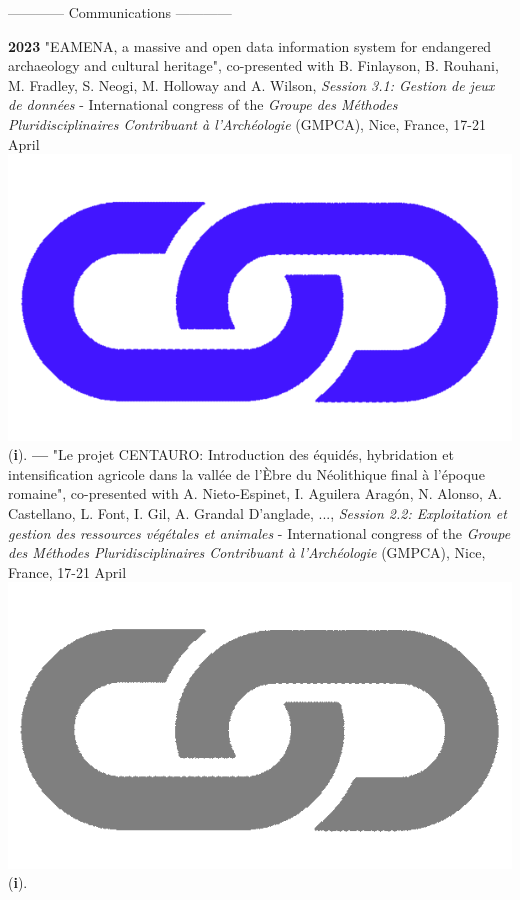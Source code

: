 \documentclass{article}
\begin{document}
\begin{center}------------ Communications ------------\end{center}
\smallbreak
\textbf{2023 }"EAMENA, a massive and open data information system for endangered archaeology and cultural heritage", co-presented with B. Finlayson, B. Rouhani, M. Fradley, S. Neogi, M. Holloway and A. Wilson, \textit{Session 3.1: Gestion de jeux de données} - International congress of the \textit{Groupe des Méthodes Pluridisciplinaires Contribuant à l'Archéologie} (GMPCA), Nice, France, 17-21 April \href{https://eamena-project.github.io/eamena-arches-dev/talks/2023-gmpca/pres/#/title-slide}{\includegraphics[scale=0.02]{link_darkblue.png}} (\textbf{i}).
\smallbreak
\textbf{--- }"Le projet CENTAURO: Introduction des équidés, hybridation et intensification agricole dans la vallée de l'Èbre du Néolithique final à l'époque romaine", co-presented with A. Nieto-Espinet, I. Aguilera Aragón, N. Alonso, A. Castellano, L. Font, I. Gil, A. Grandal D'anglade, ..., \textit{Session 2.2: Exploitation et gestion des ressources végétales et animales} - International congress of the \textit{Groupe des Méthodes Pluridisciplinaires Contribuant à l'Archéologie} (GMPCA), Nice, France, 17-21 April \href{https://gmpca2023.sciencesconf.org/}{\includegraphics[scale=0.02]{link_grey.png}} (\textbf{i}).
\end{document}

